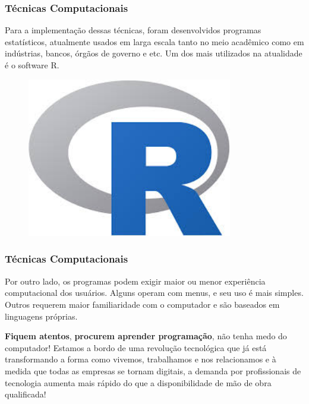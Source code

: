 \documentclass[12pt]{beamer}
\begin{document}
\begin{frame}{}
\frametitle{Técnicas Computacionais}
\begin{block}{}
\justifying
Para a implementação dessas técnicas, foram desenvolvidos programas estatísticos, atualmente usados em larga escala tanto no meio acadêmico como em indústrias, 
bancos, órgãos de governo e etc. Um dos mais utilizados na atualidade é o software R.
\end{block}
\begin{figure}[H]
    \centering
    \includegraphics[height=0.3\textwidth, width=0.8\textwidth]{figs/download.jpg}
  \end{figure}
\end{frame}

\begin{frame}{}
\frametitle{Técnicas Computacionais}
\begin{block}{}
\justifying
Por outro lado, os programas podem exigir maior ou menor experiência computacional dos usuários. Alguns operam com menus, e seu uso é mais simples. Outros 
requerem maior familiaridade com o computador e são baseados em linguagens próprias. 
\end{block}
\pause
\begin{block}{}
\justifying
\textbf{Fiquem atentos}, \textbf{procurem aprender programação}, não tenha medo do computador! Estamos a bordo de uma revolução tecnológica que já está transformando 
a forma como vivemos, trabalhamos e nos relacionamos e à medida que todas as empresas se tornam digitais, a demanda por profissionais de tecnologia aumenta 
mais rápido do que a disponibilidade de mão de obra qualificada!
\end{block}
\end{frame}
\end{document}
